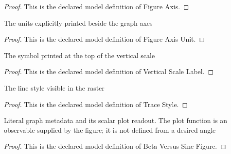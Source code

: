 \begin{proof}
  This is the declared model definition of Figure Axis.
\end{proof}
\begin{definition}
  \label{def:physics:phyx-mini-0924:phyxminiproblems-problemphyxmini0924-figureaxisunit}
  The units explicitly printed beside the graph axes
\end{definition}
\begin{proof}
  This is the declared model definition of Figure Axis Unit.
\end{proof}
\begin{definition}
  \label{def:physics:phyx-mini-0924:phyxminiproblems-problemphyxmini0924-verticalscalelabel}
  The symbol printed at the top of the vertical scale
\end{definition}
\begin{proof}
  This is the declared model definition of Vertical Scale Label.
\end{proof}
\begin{definition}
  \label{def:physics:phyx-mini-0924:phyxminiproblems-problemphyxmini0924-tracestyle}
  The line style visible in the raster
\end{definition}
\begin{proof}
  This is the declared model definition of Trace Style.
\end{proof}
\begin{definition}
  \label{def:physics:phyx-mini-0924:phyxminiproblems-problemphyxmini0924-betaversussinefigure}
  Literal graph metadata and its scalar plot readout. The plot function is an observable supplied by the figure; it is not defined from a desired angle
\end{definition}
\begin{proof}
  This is the declared model definition of Beta Versus Sine Figure.
\end{proof}
